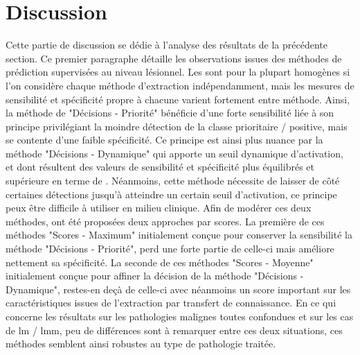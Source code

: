 \section{Discussion}
Cette partie de discussion se dédie à l'analyse des résultats de la précédente section. Ce premier paragraphe détaille les observations issues des méthodes de prédiction supervisées au niveau lésionnel. Les \fscore{} sont pour la plupart homogènes si l'on considère chaque méthode d'extraction indépendamment, mais les mesures de sensibilité et spécificité propre à chacune varient fortement entre méthode. Ainsi, la méthode de "Décisions - Priorité" bénéficie d'une forte sensibilité liée à son principe privilégiant la moindre détection de la classe prioritaire / positive, mais se contente d'une faible spécificité. Ce principe est ainsi plus nuance par la méthode "Décisions - Dynamique" qui apporte un seuil dynamique d'activation, et dont résultent des valeurs de sensibilité et spécificité plus équilibrés et supérieure en terme de \fscore{}. Néanmoins, cette méthode nécessite de laisser de côté certaines détections jusqu'à atteindre un certain seuil d'activation, ce principe peux être difficile à utiliser en milieu clinique. Afin de modérer ces deux méthodes, ont été proposées deux approches par scores. La première de ces méthodes "Scores - Maximum" initialement conçue pour conserver la sensibilité la méthode "Décisions - Priorité", perd une forte partie de celle-ci mais améliore nettement sa spécificité. La seconde de ces méthodes "Scores - Moyenne" initialement conçue pour affiner la décision de la méthode "Décisions - Dynamique", restes-en deçà de celle-ci avec néanmoins un score important sur les caractéristiques issues de l'extraction par transfert de connaissance. En ce qui concerne les résultats sur les pathologies malignes toutes confondues et sur les cas de \gls{lm} / \gls{lmm}, peu de différences sont à remarquer entre ces deux situations, ces méthodes semblent ainsi robustes au type de pathologie traitée.\par
\clearpage

